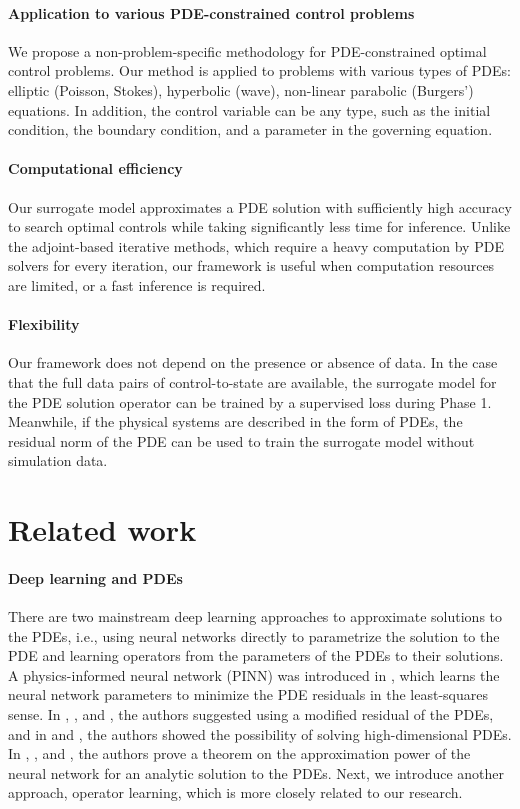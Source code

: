\documentclass[letterpaper]{article}
\begin{document}
\paragraph{Application to various PDE-constrained control problems}We propose a non-problem-specific methodology for PDE-constrained optimal control problems. Our method is applied to problems with various types of PDEs: elliptic (Poisson, Stokes), hyperbolic (wave), non-linear parabolic (Burgers') equations. In addition, the control variable can be any type, such as the initial condition, the boundary condition, and a parameter in the governing equation.

\paragraph{Computational efficiency} Our surrogate model approximates a PDE solution with sufficiently high accuracy to search optimal controls while taking significantly less time for inference. Unlike the adjoint-based iterative methods, which require a heavy computation by PDE solvers for every iteration, our framework is useful when computation resources are limited, or a fast inference is required.

\paragraph{Flexibility} Our framework does not depend on the presence or absence of data. In the case that the full data pairs of control-to-state are available, the surrogate model for the PDE solution operator can be trained by a supervised loss during Phase 1. Meanwhile, if the physical systems are described in the form of PDEs, the residual norm of the PDE can be used to train the surrogate model without simulation data.


 
\section*{Related work}\label{realted}

\paragraph{Deep learning and PDEs}
There are two mainstream deep learning approaches to approximate solutions to the PDEs, i.e., using neural networks directly to parametrize the solution to the PDE and learning operators from the parameters of the PDEs to their solutions. A physics-informed neural network (PINN) was introduced in \cite{raissi2019physics}, which learns the neural network parameters to minimize the PDE residuals in the least-squares sense. In \cite{nabian2018deep}, \cite{son2021sobolev}, and \cite{weinan2018deep}, the authors suggested using a modified residual of the PDEs, and in \cite{han2018solving} and \cite{sirignano2018dgm}, the authors showed the possibility of solving high-dimensional PDEs. In \cite{hwang2020trend}, \cite{jo2020deep}, and \cite{sirignano2018dgm}, the authors prove a theorem on the approximation power of the neural network for an analytic solution to the PDEs. Next, we introduce another approach, operator learning, which is more closely related to our research.
\end{document}
